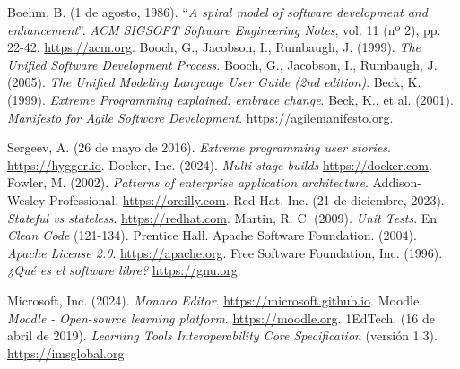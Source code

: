 \begin{thebibliography}{99}
     Boehm, B. (1 de agosto, 1986). ``\textit{A spiral model of software development and enhancement}''. \textit{ACM SIGSOFT Software Engineering Notes}, vol. 11 (nº 2), pp. 22-42. \href{https://dl.acm.org/doi/10.1145/12944.12948}{https://acm.org}.
     Booch, G., Jacobson, I., Rumbaugh, J. (1999). \textit{The Unified Software Development Process}.
     Booch, G., Jacobson, I., Rumbaugh, J. (2005). \textit{The Unified Modeling Language User Guide (2nd edition)}.
     Beck, K. (1999). \textit{Extreme Programming explained: embrace change}.
     Beck, K., et al. (2001). \textit{Manifesto for Agile Software Development}. \href{https://agilemanifesto.org}{https://agilemanifesto.org}.

     Sergeev, A. (26 de mayo de 2016). \textit{Extreme programming user stories}. \href{https://hygger.io/blog/extreme-programming-user-stories/}{https://hygger.io}.
     Docker, Inc. (2024). \textit{Multi-stage builds} \href{https://docs.docker.com/build/building/multi-stage}{https://docker.com}.
     Fowler, M. (2002). \textit{Patterns of enterprise application architecture}. Addison-Wesley Professional. \href{https://www.oreilly.com/library/view/patterns-of-enterprise/0321127420/}{https://oreilly.com}.
     Red Hat, Inc. (21 de diciembre, 2023). \textit{Stateful vs stateless}. \href{https://www.redhat.com/en/topics/cloud-native-apps/stateful-vs-stateless}{https://redhat.com}.
     Martin, R. C. (2009). \textit{Unit Tests}. En \textit{Clean Code} (121-134). Prentice Hall.
     Apache Software Foundation. (2004). \textit{Apache License 2.0}. \href{https://www.apache.org/licenses/LICENSE-2.0.txt}{https://apache.org}.
     Free Software Foundation, Inc. (1996). \textit{¿Qué es el software libre?} \href{https://www.gnu.org/philosophy/free-sw.es.html#four-freedoms}{https://gnu.org}.

     Microsoft, Inc. (2024). \textit{Monaco Editor}. \href{https://microsoft.github.io/monaco-editor/}{https://microsoft.github.io}.
     Moodle. \textit{Moodle - Open-source learning platform}. \href{https://moodle.org}{https://moodle.org}.
     1EdTech. (16 de abril de 2019). \textit{Learning Tools Interoperability Core Specification} (versión 1.3). \href{https://www.imsglobal.org/spec/lti/v1p3}{https://imsglobal.org}.
\end{thebibliography}

\raggedbottom
\newpage
